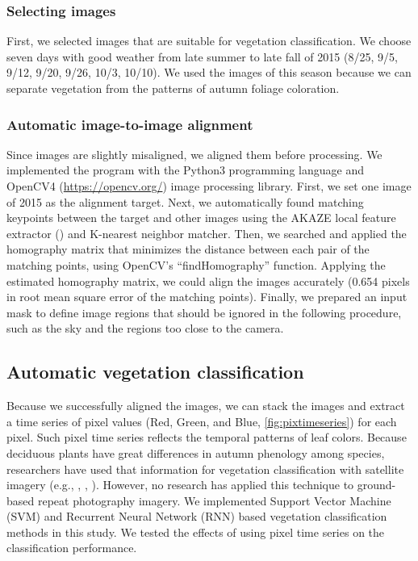\documentclass{article}
\begin{document}
\hypertarget{selecting-images}{%
\subsubsection{Selecting images}\label{selecting-images}}

First, we selected images that are suitable for vegetation classification. We choose seven days with good weather from late summer to late fall of 2015 (8/25, 9/5, 9/12, 9/20, 9/26, 10/3, 10/10). We used the images of this season because we can separate vegetation from the patterns of autumn foliage coloration.

\hypertarget{automatic-image-to-image-alignment}{%
\subsubsection{Automatic image-to-image alignment}\label{automatic-image-to-image-alignment}}

Since images are slightly misaligned, we aligned them before processing. We implemented the program with the Python3 programming language and OpenCV4 (\url{https://opencv.org/}) image processing library. First, we set one image of 2015 as the alignment target. Next, we automatically found matching keypoints between the target and other images using the AKAZE local feature extractor (\cite{Alcantarilla2013AKAZE}) and K-nearest neighbor matcher. Then, we searched and applied the homography matrix that minimizes the distance between each pair of the matching points, using OpenCV's ``findHomography'' function. Applying the estimated homography matrix, we could align the images accurately (0.654 pixels in root mean square error of the matching points). Finally, we prepared an input mask to define image regions that should be ignored in the following procedure, such as the sky and the regions too close to the camera.

\hypertarget{automatic-vegetation-classification}{%
\subsection{Automatic vegetation classification}\label{automatic-vegetation-classification}}

Because we successfully aligned the images, we can stack the images and extract a time series of pixel values (Red, Green, and Blue, \ref{fig:pixtimeseries}) for each pixel. Such pixel time series reflects the temporal patterns of leaf colors. Because deciduous plants have great differences in autumn phenology among species, researchers have used that information for vegetation classification with satellite imagery (e.g., \cite{Tigges2013RemSenEnv}, \cite{Son2013RemSen}, \cite{Heupel2018PFG}). However, no research has applied this technique to ground-based repeat photography imagery. We implemented Support Vector Machine (SVM) and Recurrent Neural Network (RNN) based vegetation classification methods in this study. We tested the effects of using pixel time series on the classification performance.
\end{document}

